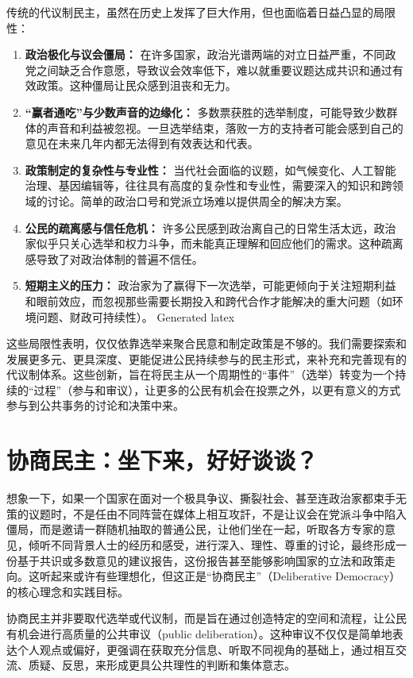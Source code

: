 \documentclass[UTF8, 10pt]{ctexbook}
\begin{document}
传统的代议制民主，虽然在历史上发挥了巨大作用，但也面临着日益凸显的局限性：
\begin{enumerate}
    \item  \textbf{政治极化与议会僵局：} 在许多国家，政治光谱两端的对立日益严重，不同政党之间缺乏合作意愿，导致议会效率低下，难以就重要议题达成共识和通过有效政策。这种僵局让民众感到沮丧和无力。
    \item  \textbf{“赢者通吃”与少数声音的边缘化：} 多数票获胜的选举制度，可能导致少数群体的声音和利益被忽视。一旦选举结束，落败一方的支持者可能会感到自己的意见在未来几年内都无法得到有效表达和代表。
    \item  \textbf{政策制定的复杂性与专业性：} 当代社会面临的议题，如气候变化、人工智能治理、基因编辑等，往往具有高度的复杂性和专业性，需要深入的知识和跨领域的讨论。简单的政治口号和党派立场难以提供周全的解决方案。
    \item  \textbf{公民的疏离感与信任危机：} 许多公民感到政治离自己的日常生活太远，政治家似乎只关心选举和权力斗争，而未能真正理解和回应他们的需求。这种疏离感导致了对政治体制的普遍不信任。
    \item  \textbf{短期主义的压力：} 政治家为了赢得下一次选举，可能更倾向于关注短期利益和眼前效应，而忽视那些需要长期投入和跨代合作才能解决的重大问题（如环境问题、财政可持续性）。
Generated latex
\end{enumerate}
这些局限性表明，仅仅依靠选举来聚合民意和制定政策是不够的。我们需要探索和发展更多元、更具深度、更能促进公民持续参与的民主形式，来补充和完善现有的代议制体系。这些创新，旨在将民主从一个周期性的“事件”（选举）转变为一个持续的“过程”（参与和审议），让更多的公民有机会在投票之外，以更有意义的方式参与到公共事务的讨论和决策中来。

\section{协商民主：坐下来，好好谈谈？}
\lettrine[lines=2]{想}{象}一下，如果一个国家在面对一个极具争议、撕裂社会、甚至连政治家都束手无策的议题时，不是任由不同阵营在媒体上相互攻訐，不是让议会在党派斗争中陷入僵局，而是邀请一群随机抽取的普通公民，让他们坐在一起，听取各方专家的意见，倾听不同背景人士的经历和感受，进行深入、理性、尊重的讨论，最终形成一份基于共识或多数意见的建议报告，这份报告甚至能够影响国家的立法和政策走向。这听起来或许有些理想化，但这正是“协商民主”（Deliberative Democracy）的核心理念和实践目标。

协商民主并非要取代选举或代议制，而是旨在通过创造特定的空间和流程，让公民有机会进行高质量的公共审议（public deliberation）。这种审议不仅仅是简单地表达个人观点或偏好，更强调在获取充分信息、听取不同视角的基础上，通过相互交流、质疑、反思，来形成更具公共理性的判断和集体意志。
\end{document}
